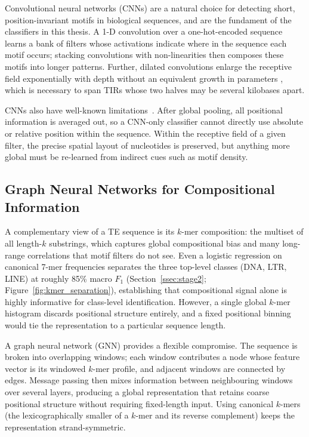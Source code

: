 \documentclass[12pt]{article}
\begin{document}
Convolutional neural networks (CNNs) \cite{lecun2015deep,krizhevsky2012imagenet,alipanahi2015deepbind} are a natural choice for detecting short, position-invariant motifs in biological sequences, and are the fundament of the classifiers in this thesis. A 1-D convolution over a one-hot-encoded sequence learns a bank of filters whose activations indicate where in the sequence each motif occurs; stacking convolutions with non-linearities then composes these motifs into longer patterns. Further, dilated convolutions enlarge the receptive field exponentially with depth without an equivalent growth in parameters \cite{yu2016dilated}, which is necessary to span TIRs whose two halves may be several kilobases apart.

CNNs also have well-known limitations~\cite{ji2021dnabert}. After global pooling, all positional information is averaged out, so a CNN-only classifier cannot directly use absolute or relative position within the sequence. Within the receptive field of a given filter, the precise spatial layout of nucleotides is preserved, but anything more global must be re-learned from indirect cues such as motif density.

\subsection{Graph Neural Networks for Compositional Information}\label{ssec:gnn_intro}

A complementary view of a TE sequence is its $k$-mer composition: the multiset of all length-$k$ substrings, which captures global compositional bias and many long-range correlations that motif filters do not see. Even a logistic regression on canonical 7-mer frequencies separates the three top-level classes (DNA, LTR, LINE) at roughly 85\% macro $F_1$ (Section~\ref{ssec:stage2}; Figure~\ref{fig:kmer_separation}), establishing that compositional signal alone is highly informative for class-level identification. However, a single global $k$-mer histogram discards positional structure entirely, and a fixed positional binning would tie the representation to a particular sequence length.

A graph neural network (GNN) \cite{kipf2016semi,hamilton2017inductive,zhou2019graph} provides a flexible compromise. The sequence is broken into overlapping windows; each window contributes a node whose feature vector is its windowed $k$-mer profile, and adjacent windows are connected by edges. Message passing then mixes information between neighbouring windows over several layers, producing a global representation that retains coarse positional structure without requiring fixed-length input. Using canonical $k$-mers (the lexicographically smaller of a $k$-mer and its reverse complement) keeps the representation strand-symmetric.
\end{document}
